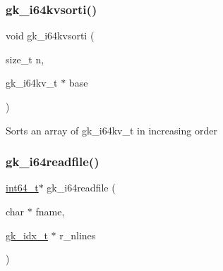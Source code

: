 \subsubsection{\texorpdfstring{gk\+\_\+i64kvsorti()}{gk\_i64kvsorti()}}
{\footnotesize\ttfamily void gk\+\_\+i64kvsorti (\begin{DoxyParamCaption}\item[{size\+\_\+t}]{n,  }\item[{gk\+\_\+i64kv\+\_\+t $\ast$}]{base }\end{DoxyParamCaption})}

Sorts an array of gk\+\_\+i64kv\+\_\+t in increasing order \mbox{\label{a00077_a8cb19aa95a831aa745f6e04e1cc0b204}} 
\subsubsection{\texorpdfstring{gk\+\_\+i64readfile()}{gk\_i64readfile()}}
{\footnotesize\ttfamily \hyperlink{a00119_a67a9885ef4908cb72ce26d75b694386c}{int64\+\_\+t}$\ast$ gk\+\_\+i64readfile (\begin{DoxyParamCaption}\item[{char $\ast$}]{fname,  }\item[{\hyperlink{a00083_a899f9d8c47b1ca0c2fead41097f4bde2}{gk\+\_\+idx\+\_\+t} $\ast$}]{r\+\_\+nlines }\end{DoxyParamCaption})}

